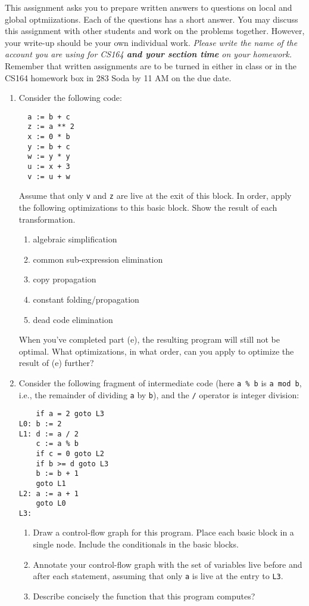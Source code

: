 \documentclass{article}
\begin{document}

This assignment asks you to prepare written answers to questions on
local and global optmiizations.  Each of the questions has a short
answer.  You may discuss this assignment with other students and work
on the problems together.  However, your write-up should be your own
individual work.  {\em Please write the name of the account you are
using for CS164 {\bf and your section time} on your homework.}
Remember that written assignments are to be turned in either in class
or in the CS164 homework box in 283 Soda by 11 AM on the due date.

\begin{enumerate}
\item Consider the following code:
\begin{verbatim}
  a := b + c
  z := a ** 2
  x := 0 * b
  y := b + c
  w := y * y
  u := x + 3
  v := u + w
\end{verbatim}
Assume that only \texttt{v} and \texttt{z} are live at the exit of
this block.  In order, apply the following optimizations to this basic
block.  Show the result of each transformation.
\begin{enumerate}
\item algebraic simplification
\item common sub-expression elimination
\item copy propagation
\item constant folding/propagation
\item dead code elimination
\end{enumerate}

When you've completed part (e), the resulting program will still not
be optimal.  What optimizations, in what order, can you apply to
optimize the result of (e) further?

\item Consider the following fragment of intermediate code (here
\verb'a % b' is \verb'a mod b', i.e., the remainder of dividing
\texttt{a} by \texttt{b}), and the \texttt{/} operator is integer
division:
\begin{verbatim}
    if a = 2 goto L3
L0: b := 2
L1: d := a / 2
    c := a % b
    if c = 0 goto L2
    if b >= d goto L3
    b := b + 1
    goto L1
L2: a := a + 1
    goto L0
L3:
\end{verbatim}
\begin{enumerate}
\item Draw a control-flow graph for this program.  Place each basic
block in a single node.  Include the conditionals in the basic blocks.
\item Annotate your control-flow graph with the set of variables live
before and after each statement, assuming that only \texttt{a} is live
at the entry to \texttt{L3}.
\item Describe concisely the function that this program computes?
\end{enumerate}

\end{enumerate}
\end{document}
